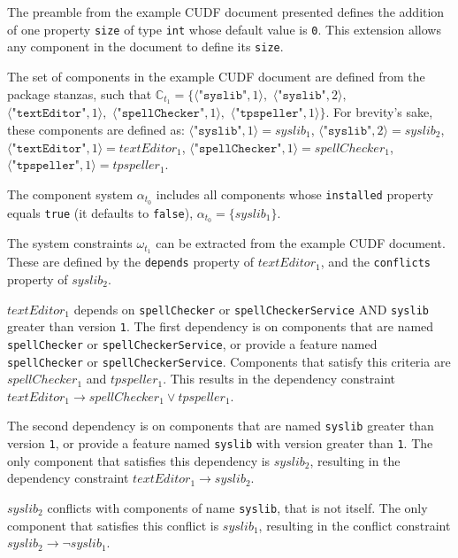 The preamble from the example CUDF document presented defines the addition of one property \verb+size+ of type \verb+int+ whose default value is \verb+0+.
This extension allows any component in the document to define its \texttt{size}.

The set of components in the example CUDF document are defined from the package stanzas,
such that $\mathbb{C}_{t_1} = \{\langle \texttt{"syslib"},1 \rangle,$
$ \langle \texttt{"syslib"},2\rangle,$
$  \langle \texttt{"textEditor"},1 \rangle,$
$  \langle \texttt{"spellChecker"},1 \rangle,$
$  \langle \texttt{"tpspeller"},1 \rangle\}$.
For brevity's sake, these components are defined as:
$\langle \texttt{"syslib"},1 \rangle = syslib_1$, $\langle \texttt{"syslib"},2\rangle = syslib_2 $,  $\langle \texttt{"textEditor"},1 \rangle =  textEditor_1 $,  
$\langle \texttt{"spellChecker"},1 \rangle =  spellChecker_1 $,  $\langle \texttt{"tpspeller"},1 \rangle =  tpspeller_1 $.

The component system $\alpha_{t_{0}}$ includes all components whose \verb+installed+ property equals \verb+true+ (it defaults to \texttt{false}),
$\alpha_{t_{0}} = \{ syslib_1 \}$.

The system constraints $\omega_{t_1}$ can be extracted from the example CUDF document.
These are defined by the \texttt{depends} property of $textEditor_1$, and the \texttt{conflicts} property of $syslib_2$.

$textEditor_1$ depends on \texttt{spellChecker} or \texttt{spellCheckerService} AND \texttt{syslib} greater than version \texttt{1}.
The first dependency is on components that are named  \texttt{spellChecker} or \texttt{spellCheckerService},
or provide a feature named \texttt{spellChecker} or \texttt{spellCheckerService}.
Components that satisfy this criteria are $ spellChecker_1$ and $tpspeller_1$.
This results in the dependency constraint $textEditor_1 \rightarrow spellChecker_1 \vee tpspeller_1$.

The second dependency is on components that are named  \texttt{syslib}  greater than version \texttt{1},
or provide a feature named \texttt{syslib} with version greater than \texttt{1}.
The only component that satisfies this dependency is $syslib_2$,
resulting in the dependency constraint $textEditor_1 \rightarrow syslib_2$.

$syslib_2$ conflicts with components of name \texttt{syslib}, that is not itself.
The only component that satisfies this conflict is $syslib_1$,
resulting in the conflict constraint $syslib_2 \rightarrow \neg syslib_1$.

